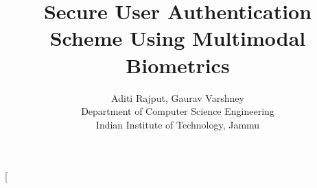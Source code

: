 \documentclass[10pt,journal,compsoc]{IEEEtran}
\begin{document}
\title{\textbf{Secure User Authentication Scheme Using Multimodal Biometrics}}

\author{Aditi Rajput, Gaurav Varshney \\
\vspace{\baselineskip}
\small{Department of Computer Science Engineering \\
Indian Institute of Technology, Jammu}
      }%
        

\twocolumn[
  \begin{@twocolumnfalse}
    \maketitle
    \begin{abstract}

\end{abstract}
\end{@twocolumnfalse}
\end{document}
